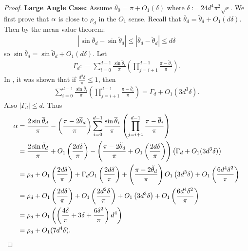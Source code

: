 \documentclass{article}
\begin{document}
\begin{proof}
\textbf{Large Angle Case:} Assume $\overline{\theta}_0 = \pi + O_1(\delta)$ where $\delta := 24d^4\pi^2\sqrt{\epsilon}.$  We first prove that $\alpha$ is close to $\rho_d$ in the $O_1$ sense. Recall that $\overline{\theta}_d = \breve{\theta}_d + O_1(d\delta)$. Then by the mean value theorem: \begin{align*}
|\sin \overline{\theta}_d - \sin \breve{\theta}_d | \leq |\overline{\theta}_d - \breve{\theta}_d | \leq d \delta
\end{align*} so $\sin \overline{\theta}_d = \sin \breve{\theta}_d + O_1(d\delta)$. Let \begin{align*}
\Gamma_d : = \sum_{i=0}^{d-1} \frac{\sin \breve{\theta}_i}{\pi}\left(\prod_{j=i+1}^{d-1} \frac{\pi - \breve{\theta}_i}{\pi}\right).
\end{align*} In \cite{Hand2017}, it was shown that if $\frac{d^2\delta}{\pi} \leq 1$, then
\begin{align*}
\sum_{i=0}^{d-1} \frac{\sin \overline{\theta}_i}{\pi}\left(\prod_{j=i+1}^{d-1} \frac{\pi - \overline{\theta}_i}{\pi}\right) = \Gamma_d + O_1(3d^3\delta).
\end{align*} Also $|\Gamma_d| \leq d$.
Thus \begin{align*}
\al & = \frac{2\sin \overline{\theta}_d}{\pi} - \left(\frac{\pi - 2\overline{\theta}_d}{\pi}\right) \sum_{i=0}^{d-1} \frac{\sin \overline{\theta}_i}{\pi}\left(\prod_{j=i+1}^{d-1} \frac{\pi - \overline{\theta}_i}{\pi}\right) \\
& = \frac{2\sin \breve{\theta}_d}{\pi} + O_1\left(\frac{2d\delta}{\pi}\right) - \left(\frac{\pi - 2 \breve{\theta}_d}{\pi} + O_1 \left(\frac{2d\delta}{\pi}\right)\right)\left(\Gamma_d + O_1(3d^3 \delta)\right) \\
& = \rho_d + O_1\left(\frac{2d\delta}{\pi}\right) + \Gamma_d O_1\left(\frac{2d\delta}{\pi}\right) + \left(\frac{\pi - 2\breve{\theta}_d}{\pi}\right)O_1\left(3d^3\delta\right) + O_1 \left(\frac{6d^4\delta^2}{\pi}\right) \\
& = \rho_d + O_1\left(\frac{2d\delta}{\pi}\right) + O_1\left(\frac{2d^2\delta}{\pi}\right)+ O_1\left(3d^3\delta\right) + O_1\left(\frac{6d^4\delta^2}{\pi}\right) \\
& = \rho_d + O_1 \left(\left(\frac{4\delta}{\pi} + 3\delta + \frac{6\delta^2}{\pi}\right)d^4\right) \\
& = \rho_d + O_1(7d^4\delta).

\end{align*}
\end{proof}
\end{document}

